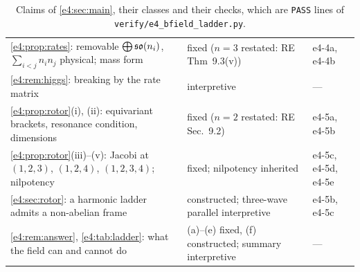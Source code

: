 \begin{table}[htbp]
\begin{tabular}{@{}>{\raggedright\arraybackslash}p{8.0cm}>{\raggedright\arraybackslash}p{4.8cm}>{\raggedright\arraybackslash}p{2.0cm}@{}}
\cref{e4:prop:rates}: removable $\bigoplus\mathfrak{so}(n_i)$, $\sum_{i<j}n_in_j$ physical; mass form & fixed ($n=3$ restated: RE Thm~9.3(v)) & e4-4a, e4-4b\\
\cref{e4:rem:higgs}: breaking by the rate matrix & interpretive & ---\\
\cref{e4:prop:rotor}(i), (ii): equivariant brackets, resonance condition, dimensions & fixed ($n=2$ restated: RE Sec.~9.2) & e4-5a, e4-5b\\
\cref{e4:prop:rotor}(iii)--(v): Jacobi at $(1,2,3)$, $(1,2,4)$, $(1,2,3,4)$; nilpotency & fixed; nilpotency inherited & e4-5c, e4-5d, e4-5e\\
\cref{e4:sec:rotor}: a harmonic ladder admits a non-abelian frame & constructed; three-wave parallel interpretive & e4-5b, e4-5c\\
\cref{e4:rem:answer}, \cref{e4:tab:ladder}: what the field can and cannot do & (a)--(e) fixed, (f) constructed; summary interpretive & ---\\
\bottomrule
\end{tabular}
\caption{Claims of \cref{e4:sec:main}, their classes and their checks, which are \texttt{PASS} lines of \texttt{verify/e4\_bfield\_ladder.py}.}
\label{e4:tab:claims}
\end{table}
